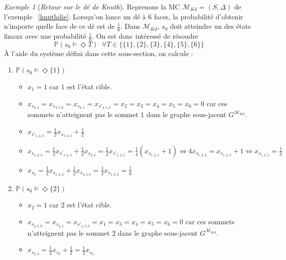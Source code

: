 \documentclass[12pt,a4paper]{report}
\theoremstyle{definition}
\theoremstyle{remark}
\newtheorem{example}{Exemple}[chapter]
\let\labelitemi\labelitemii
\begin{document}
\begin{example}[\textit{Retour sur le dé de Knuth}]
	Reprenons la MC $\mathcal{M}_{Kd} = (S, \Delta)$ de l'exemple ~\ref{knuthdie}. Lorsqu'on lance un dé à $6$ faces, la probabilité d'obtenir n'importe quelle face de ce dé est de $\frac{1}{6}$. Dans $\mathcal{M}_{Kd}$, $s_0$ doit atteindre un des états finaux avec une probabilité $\frac{1}{6}$. On est donc intéressé de résoudre \[\mathbb{P}(s_0 \models \Diamond T) \;\; \forall T \in \{\{1\},\{2\},\{3\},\{4\},\{5\},\{6\}\} \]
	\`A l'aide du système défini dans cette sous-section, on calcule :
	\begin{spacing}{1.5}
	\begin{enumerate}
		\item $\mathbb{P}(s_0 \models \Diamond \{1\})$
		\begin{itemize}
			\renewcommand{\labelitemi}{\tiny$\bullet$}
			\item $x_1 = 1 $ car $1$ est l'état cible.
			\item $x_{s_{2, 3}} = x_{s_{4, 5, 6}} = x_{s_{4, 5}} = x_{s'_{4, 5, 6}} = x_2 = x_3 = x_4 = x_5 = x_6 = 0$ car ces sommets n'atteignent pas le sommet $1$ dans le graphe sous-jacent $G^{\mathcal{M}_{Kd}}$.
			\item $x_{s'_{1, 2, 3}} = \frac{1}{2} x_{s_{1, 2, 3}} + \frac{1}{2}$
			\item $x_{s_{1, 2, 3}} = \frac{1}{2} x_{s'_{1, 2, 3}} + \frac{1}{2}x_{s_{2, 3}} = \frac{1}{2} x_{s'_{1, 2, 3}} = \frac{1}{4} (x_{s_{1, 2, 3}} + 1) \Leftrightarrow
			4 x_{s_{1, 2, 3}} =x_{s_{1, 2, 3}} + 1 \Leftrightarrow x_{s_{1, 2, 3}} = \frac{1}{3}$
			\item $x_{s_0} = \frac{1}{2} x_{s_{1,2,3}} + \frac{1}{2} x_{s_{4, 5, 6}} = \frac{1}{2} x_{s_{1,2,3}} = \frac{1}{6}$
		\end{itemize}
		\item $\mathbb{P}(s_0 \models \Diamond \{2\})$
		\begin{itemize}
			\renewcommand{\labelitemi}{\tiny$\bullet$}
			\item $x_2 = 1 $ car $2$ est l'état cible.
			\item $x_{s_{4, 5, 6}} = x_{s_{4, 5}} = x_{s'_{4, 5, 6}} = x_1 = x_3 = x_4 = x_5 = x_6 = 0$ car ces sommets n'atteignent pas le sommet $2$ dans le graphe sous-jacent $G^{\mathcal{M}_{Kd}}$.
			\item $x_{s_{2, 3}} = \frac{1}{2} x_{s_3}  + \frac{1}{2} = \frac{1}{2} x_{s_2}$

\end{itemize}
\end{enumerate}
\end{spacing}
\end{example}
\end{document}

